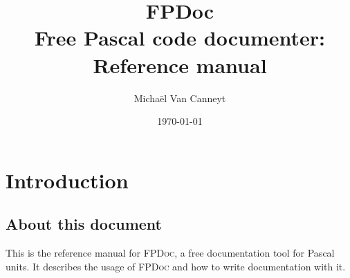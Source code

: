 %
%
%
%
%

%
%
\makeindex
%
%
\newcommand{\fpdoc}{\textsc{FPDoc}\xspace}
\newcommand{\seesu}[1]{section \ref{suse:#1}, page \pageref{suse:#1}\xspace}
\newcommand{\seetag}[1]{\tag{#1} (\pageref{tag:#1})\xspace}
\newcommand{\tag}[1]{\textbf{#1}}
\newcommand{\attr}[1]{\textit{#1}}
\usepackage{tabularx}
\usepackage{syntax}

\title{FPDoc\\Free Pascal code documenter: Reference manual}
\date{\today}
\author{Micha\"el Van Canneyt}
\maketitle
\tableofcontents

\chapter{Introduction}

\section{About this document}
This is the reference manual for \fpdoc, a free documentation tool for 
Pascal units. It describes the usage of \fpdoc and how to write 
documentation with it. 


